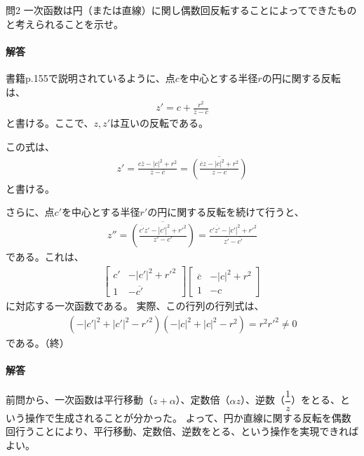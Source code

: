 \newpage
\begin{mysimplebox}{問2}
    一次函数は円（または直線）に関し偶数回反転することによってできたものと考えられることを示せ。
\end{mysimplebox}
\paragraph{解答}
書籍p.155で説明されているように、点$c$を中心とする半径$r$の円に関する反転は、
\begin{align*}
    z'=c+\frac{r^2}{\overline{z}-\overline{c}}
\end{align*}
と書ける。ここで、$z,z'$は互いの反転である。

この式は、
\begin{align*}
    z'=\frac{c\overline{z}-|c|^2+r^2}{\overline{z}-\overline{c}}
    =\overline{\left(\frac{\overline{c}z-|c|^2+r^2}{z-c}\right)}
\end{align*}
と書ける。

さらに、点$c'$を中心とする半径$r'$の円に関する反転を続けて行うと、
\begin{align*}
    z''=\overline{\left(\frac{\overline{c'}z'-|c'|^2+r'^2}{z'-c'}\right)}
    =\frac{c'\overline{z'}-|c'|^2+r'^2}{\overline{z'}-\overline{c'}}
\end{align*}
である。これは、
\begin{align*}
    \begin{bmatrix}
        c'&-|c'|^2+r'^2\\
        1&-\overline{c'}
    \end{bmatrix}
    \begin{bmatrix}
        \overline{c}&-|c|^2+r^2\\
        1&-c
    \end{bmatrix}
\end{align*}
に対応する一次函数である。
実際、この行列の行列式は、
\begin{align*}
    (-|c'|^2+|c'|^2-r'^2)(-|c|^2+|c|^2-r^2)=r^2r'^2\neq0
\end{align*}
である。（終）

\paragraph{解答}
前問から、一次函数は平行移動（$z+\alpha$）、定数倍（$\alpha z$）、逆数（$\dfrac{1}{z}$）をとる、という操作で生成されることが分かった。
よって、円か直線に関する反転を偶数回行うことにより、平行移動、定数倍、逆数をとる、という操作を実現できればよい。

